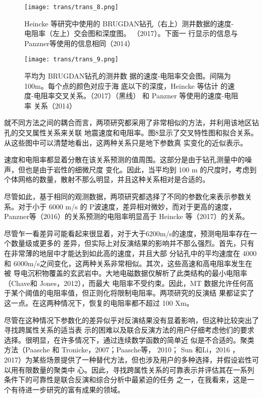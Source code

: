 \begin{figure}[]
    \centering
    \texttt{[image: trans/trans\_8.png]}
    \caption{Heincke 等研究中使用的 BRUGDAN钻孔（右上）测井数据的速度-电阻率（左上）交会图和深度图。 （2017）。下面一 行显示的信息与 Panzner等使用的信息相同（2014）}

\end{figure}

\begin{figure}[]
    \centering
    \texttt{[image: trans/trans\_9.png]}
    \caption{平均为 BRUGDAN钻孔的测井数 据的速度-电阻率交会图。间隔为100m。每个点的颜色对应于海 底以下的深度，Heincke 等估计 的速度-电阻率交叉关系。（2017）（黑线） 和 Panzner 等使用的速度-电阻率 关系（2014） }

\end{figure}

就不同方法之间的耦合而言，两项研究都采用了非常相似的方法，并利用该地区钻孔的交叉属性关系来关联 地震速度和电阻率。图8显示了交叉特性图和拟合关系。从这些图中可以清楚地看出，这两种关系只是地下参数真 实变化的近似表示。

速度和电阻率都显着分散在该关系预测的值周围。这部分是由于钻孔测量中的噪声，但也是由于岩性的细微尺度 变化。因此，当平均到 100 m 的尺度时，考虑到个体网格的数量，散射不那么明显，并且这种关系相对是合适的。

尽管如此，基于相同的观测数据，两项研究都选择了不同的参数化来表示参数关系。对于小于 6000 m/s 的 P波速度，差异相对微妙，而对于更高的速度，Panzner等（2016）的关系预测的电阻率明显高于 Heincke 等（2017）的关系。

尽管乍一看差异可能看起来很显着，对于大于6200m/s的速度，预测电阻率存在一个数量级或更多的 差异，但实际上对反演结果的影响并不那么强烈。首先，只有在非常薄的地层中才能达到如此高的速度，并且大部 分钻孔中的平均速度在 4000 和 6000m/s之间变化，这两种关系非常相似。其次，这些高速和高电阻率发生在被 导电沉积物覆盖的玄武岩中。大地电磁数据仅解析了此类结构的最小电阻率（Chave和 Jones，2012），而最大 电阻率不受约束。因此，MT 数据允许任何高于某个阈值的电阻率值，但正则化将限制电阻率。两项研究的反演结 果都证实了这一点。在这两种情况下，恢复的电阻率都不超过 100 Xm。

尽管在这种情况下参数化的差异似乎对反演结果没有显着影响，但这种比较突出了寻找跨属性关系的适当表 示的困难以及联合反演方法的用户仔细考虑他们的要求选择。很明显，在许多情况下，通过连续数学函数的简单近 似是不合适的。聚类方法（Paasche 和 Tronicke，2007；Paasche等， 2010； Sun 和Li，2016 ， 2017）为某些场景提供了一种替代方法，但也涉及用户的多种选择，并假设岩性可以用有限数量的聚类中 心。因此，寻找跨属性关系的可靠表示并评估其在一系列条件下的可靠性是联合反演和综合分析中最紧迫的任务 之一，在我看来，这是一个有待进一步研究的富有成果的领域。

